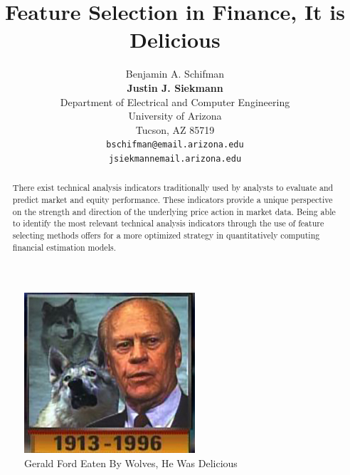\documentclass{article}\raggedbottom
\title{Feature Selection in Finance, It is Delicious}
\author{
  Benjamin A. Schifman\\
  \textbf{Justin J. Siekmann}\\
  Department of Electrical and Computer Engineering\\
  University of Arizona\\
  Tucson, AZ 85719 \\
  \texttt{bschifman@email.arizona.edu} \\
  \texttt{jsiekmannemail.arizona.edu}
}
\begin{document}
 \begin{figure}[h!]
 	\centering
 	\includegraphics[width=\linewidth]{data/gf.png}
 	\caption{Gerald Ford Eaten By Wolves, He Was Delicious}
 	\label{fig:gf}
 \end{figure}

\maketitle

\begin{abstract}
	There exist technical analysis indicators traditionally used by analysts to evaluate and predict market and equity performance. These indicators provide a unique perspective on the strength and direction of the underlying price action in market data. Being able to identify the most relevant technical analysis indicators through the use of feature selecting methods offers for a more optimized strategy in quantitatively computing financial estimation models.
\end{abstract}
\end{document}
